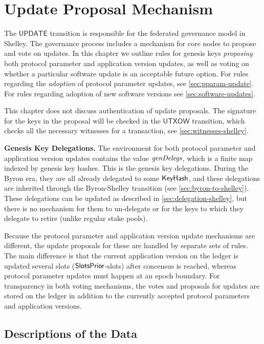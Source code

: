 \section{Update Proposal Mechanism}
\label{sec:update}


The $\mathsf{UPDATE}$ transition is responsible for the federated governance model in Shelley.
The governance process includes a mechanism for core nodes to propose and vote on
updates. In this chapter we
outline rules for genesis keys \textit{proposing} both protocol parameter
and application version updates, as well as voting on whether a particular
software update is an acceptable future option.
For rules regarding the \textit{adoption} of protocol
parameter updates, see \ref{sec:pparam-update}. For rules regarding
adoption of new software versions see \ref{sec:software-updates}.

This chapter does not discuss authentication of update proposals.
The signature for the keys in the proposal will be checked in the
$\mathsf{UTXOW}$ transition, which checks all the necessary witnesses
for a transaction, see \ref{sec:witnesses-shelley}.

\textbf{Genesis Key Delegations.} The environment for both protocol parameter
and application version updates contains
the value $\mathit{genDelegs}$, which is a finite map indexed by genesis key hashes.
This is the genesis key delegations. During the Byron era, they are all
already delegated to some $\mathsf{KeyHash}$, and these delegations are inherited
through the Byron-Shelley transition (see \ref{sec:byron-to-shelley}).
These delegations can be updated as described in \ref{sec:delegation-shelley},
but there is no mechanism for them to un-delegate or for the keys to which they delegate
to retire (unlike regular stake pools).

Because the protocol parameter and application version update mechanisms are different, the
update proposals for these are handled by separate sets of rules. The main
difference is that the current application version on the ledger is updated
several slots ($\mathsf{SlotsPrior}$-slots) after concensus is reached, whereas protocol
parameter updates must happen at an epoch boundary.
For transparency in both voting mechanisms, the votes and proposals for updates
are stored
on the ledger in addition to the currently accepted protocol parameters and
application versions.

\subsection{Descriptions of the Data}
\label{sec:update-types}

